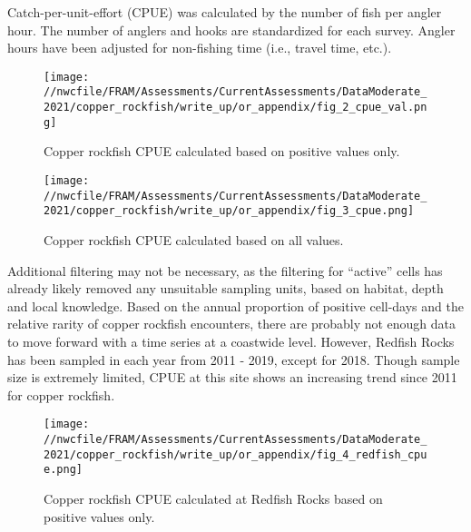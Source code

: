 \documentclass[11pt,
  english,
  a4paper,
]{article}
\begin{document}

Catch-per-unit-effort (CPUE) was calculated by the number of fish per angler hour. The number of anglers and hooks are standardized for each survey. Angler hours have been adjusted for non-fishing time (i.e., travel time, etc.).

\leavevmode\tagmcend\tagstructend\par


\begin{figure}
\centering
\texttt{[image: //nwcfile/FRAM/Assessments/CurrentAssessments/DataModerate\_2021/copper\_rockfish/write\_up/or\_appendix/fig\_2\_cpue\_val.png]}
\caption{Copper rockfish CPUE calculated based on positive values only.\label{fig:fig-2}}
\end{figure}

\tagmcend\tagstructend


\begin{figure}
\centering
\texttt{[image: //nwcfile/FRAM/Assessments/CurrentAssessments/DataModerate\_2021/copper\_rockfish/write\_up/or\_appendix/fig\_3\_cpue.png]}
\caption{Copper rockfish CPUE calculated based on all values.\label{fig:fig-3}}
\end{figure}

\tagmcend\tagstructend


Additional filtering may not be necessary, as the filtering for ``active'' cells has already likely removed any unsuitable sampling units, based on habitat, depth and local knowledge. Based on the annual proportion of positive cell-days and the relative rarity of copper rockfish encounters, there are probably not enough data to move forward with a time series at a coastwide level. However, Redfish Rocks has been sampled in each year from 2011 - 2019, except for 2018. Though sample size is extremely limited, CPUE at this site shows an increasing trend since 2011 for copper rockfish.

\leavevmode\tagmcend\tagstructend\par


\begin{figure}
\centering
\texttt{[image: //nwcfile/FRAM/Assessments/CurrentAssessments/DataModerate\_2021/copper\_rockfish/write\_up/or\_appendix/fig\_4\_redfish\_cpue.png]}
\caption{Copper rockfish CPUE calculated at Redfish Rocks based on positive values only.\label{fig:fig-4}}
\end{figure}
\end{document}
